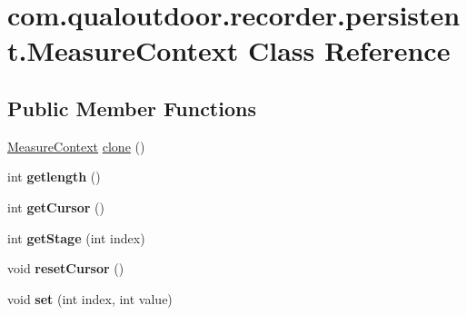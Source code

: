 \hypertarget{classcom_1_1qualoutdoor_1_1recorder_1_1persistent_1_1MeasureContext}{\section{com.\-qualoutdoor.\-recorder.\-persistent.\-Measure\-Context Class Reference}
\label{classcom_1_1qualoutdoor_1_1recorder_1_1persistent_1_1MeasureContext}
}
\subsection*{Public Member Functions}
\begin{DoxyCompactItemize}
\item 
\hyperlink{classcom_1_1qualoutdoor_1_1recorder_1_1persistent_1_1MeasureContext}{Measure\-Context} \hyperlink{classcom_1_1qualoutdoor_1_1recorder_1_1persistent_1_1MeasureContext_a1f3da609880a4aaf69c29cb94f61488f}{clone} ()
\item 
\hypertarget{classcom_1_1qualoutdoor_1_1recorder_1_1persistent_1_1MeasureContext_a7801f88d264dd4814f5b0a9d8a8ac5e6}{int {\bfseries getlength} ()}\label{classcom_1_1qualoutdoor_1_1recorder_1_1persistent_1_1MeasureContext_a7801f88d264dd4814f5b0a9d8a8ac5e6}

\item 
\hypertarget{classcom_1_1qualoutdoor_1_1recorder_1_1persistent_1_1MeasureContext_ae064b805fa6196a8e545e4ed461e8168}{int {\bfseries get\-Cursor} ()}\label{classcom_1_1qualoutdoor_1_1recorder_1_1persistent_1_1MeasureContext_ae064b805fa6196a8e545e4ed461e8168}

\item 
\hypertarget{classcom_1_1qualoutdoor_1_1recorder_1_1persistent_1_1MeasureContext_a87ab3849cdf6ec4d8608bcb343de9b70}{int {\bfseries get\-Stage} (int index)}\label{classcom_1_1qualoutdoor_1_1recorder_1_1persistent_1_1MeasureContext_a87ab3849cdf6ec4d8608bcb343de9b70}

\item 
\hypertarget{classcom_1_1qualoutdoor_1_1recorder_1_1persistent_1_1MeasureContext_a623c0d7464194d35b2e6e9f42a33ddf1}{void {\bfseries reset\-Cursor} ()}\label{classcom_1_1qualoutdoor_1_1recorder_1_1persistent_1_1MeasureContext_a623c0d7464194d35b2e6e9f42a33ddf1}

\item 
\hypertarget{classcom_1_1qualoutdoor_1_1recorder_1_1persistent_1_1MeasureContext_a45e3bae7db643bf077962cba6748e6f1}{void {\bfseries set} (int index, int value)}\label{classcom_1_1qualoutdoor_1_1recorder_1_1persistent_1_1MeasureContext_a45e3bae7db643bf077962cba6748e6f1}


\end{DoxyCompactItemize}
